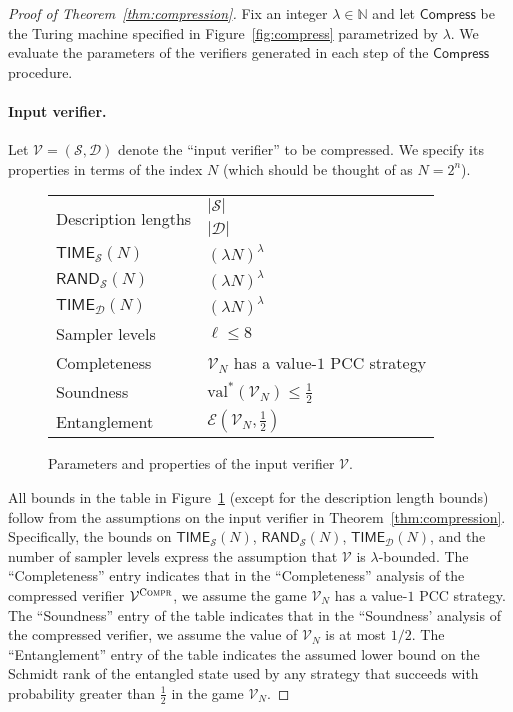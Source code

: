\documentclass[11pt]{article}
\theoremstyle{definition}
\newcommand{\N}{\ensuremath{\mathbb{N}}}
\newcommand{\val}{\ensuremath{\mathrm{val}}}
\newcommand{\sampler}{\mathcal{S}}
\newcommand{\decider}{\mathcal{D}}
\newcommand{\verifier}{\mathcal{V}}
\newcommand{\Ent}{\mathscr{E}}
\newcommand{\compr}{\textsc{Compr}}
\newcommand{\TIME}{\mathsf{TIME}}
\newcommand{\RAND}{\mathsf{RAND}}
\newcommand{\tmstyle}[1]{\ensuremath{\mathsf{#1}}}
\newcommand{\Compress}{\tmstyle{Compress}}
\begin{document}
\begin{proof}[Proof of Theorem~\ref{thm:compression}]
  Fix an integer $\lambda \in \N$ and let $\Compress$ be the Turing machine
  specified in Figure~\ref{fig:compress} parametrized by $\lambda$.
  We evaluate the parameters of the verifiers generated in each step of the
  $\Compress$ procedure.

  \paragraph{Input verifier.}
  Let $\verifier = (\sampler,\decider)$ denote the ``input verifier'' to be
  compressed.
  We specify its properties in terms of the index $N$ (which should be thought
  of as $N = 2^n$).

  \begin{figure}[H]
    \begin{center}
      \renewcommand{\arraystretch}{1.2}
      \begin{tabularx}{0.7\textwidth}{l X}
        \toprule
        \multirow{2}{*}{Description lengths} & $|\sampler|$ \\
        & $|\decider|$ \\
        $\TIME_\sampler(N)$ & $(\lambda N)^\lambda$\\
        $\RAND_\sampler(N)$ & $(\lambda N)^\lambda$ \\
        $\TIME_\decider(N)$ & $(\lambda N)^\lambda$ \\
        Sampler levels &  $\ell\leq 8$ \\
        Completeness & $\verifier_N$ has a value-$1$ PCC strategy\\
        Soundness & $\val^*(\verifier_N) \leq \frac{1}{2}$ \\
        Entanglement & $\Ent(\verifier_N,\frac{1}{2})$ \\
        \bottomrule
      \end{tabularx}
      \caption{Parameters and properties of the input verifier $\verifier$.}
      \label{tab:input}
    \end{center}
  \end{figure}

  All bounds in the table in Figure~\ref{tab:input} (except for the description
  length bounds) follow from the assumptions on the input verifier in
  Theorem~\ref{thm:compression}.
  Specifically, the bounds on $\TIME_\sampler(N)$, $\RAND_\sampler(N)$,
  $\TIME_\decider(N)$, and the number of sampler levels express the assumption
  that $\verifier$ is $\lambda$-bounded.
  The ``Completeness'' entry indicates that in the ``Completeness'' analysis of
  the compressed verifier $\verifier^\compr$, we assume the game $\verifier_N$
  has a value-$1$ PCC strategy.
  The ``Soundness'' entry of the table indicates that in the ``Soundness'
  analysis of the compressed verifier, we assume the value of $\verifier_N$ is
  at most $1/2$.
  The ``Entanglement'' entry of the table indicates the assumed lower bound on
  the Schmidt rank of the entangled state used by any strategy that succeeds
  with probability greater than $\frac{1}{2}$ in the game $\verifier_N$.


\end{proof}
\end{document}
